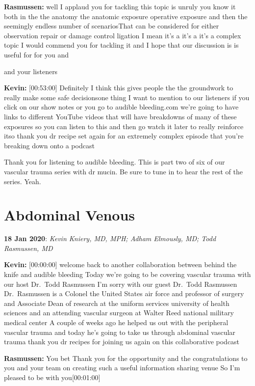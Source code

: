 \documentclass[
]{book}
\begin{document}
\textbf{Rasmussen:} well I applaud you for tackling this topic is unruly you
know it both in the the anatomy the anatomic exposure operative exposure
and then the seemingly endless number of scenariosThat can be considered
for either observation repair or damage control ligation I mean it's a
it's a it's a complex topic I would commend you for tackling it and I
hope that our discussion is is useful for for you and

and your listeners

\textbf{Kevin:} {[}00:53:00{]} Definitely I think this gives people the the
groundwork to really make some safe decisionsone thing I want to mention
to our listeners if you click on our show notes or you go to audible
bleeding.com we're going to have links to different YouTube videos that
will have breakdowns of many of these exposures so you can listen to
this and then go watch it later to really reinforce itso thank you dr
recipe set again for an extremely complex episode that you're breaking
down onto a podcast

Thank you for listening to audible bleeding. This is part two of six of
our vascular trauma series with dr mucin. Be sure to tune in to hear the
rest of the series. Yeah.

\hypertarget{abdominal-venous}{%
\section{Abdominal Venous}\label{abdominal-venous}}

\textbf{18 Jan 2020}: \emph{Kevin Kniery, MD, MPH; Adham Elmously, MD; Todd
Rasmussen, MD}

\textbf{Kevin:} {[}00:00:00{]} welcome back to another collaboration between
behind the knife and audible bleeding Today we're going to be covering
vascular trauma with our host Dr.~Todd Rasmussen I'm sorry with our
guest Dr.~Todd Rasmussen Dr.~Rasmussen is a Colonel the United States
air force and professor of surgery and Associate Dean of research at the
uniform services university of health sciences and an attending vascular
surgeon at Walter Reed national military medical center A couple of
weeks ago he helped us out with the peripheral vascular trauma and today
he's going to take us through abdominal vascular trauma thank you dr
recipes for joining us again on this collaborative podcast

\textbf{Rasmussen:} You bet Thank you for the opportunity and the
congratulations to you and your team on creating such a useful
information sharing venue So I'm pleased to be with you{[}00:01:00{]}
\end{document}
